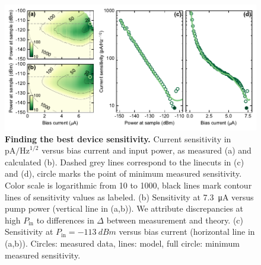 \begin{figure}
	\centering
	\includegraphics[width=\linewidth]{chapter-currentdetection/figures/Figure4}
	\caption{
		\textbf{Finding the best device sensitivity.}
		Current sensitivity in $\si{\pico\ampere\per\hertz\tothe{1/2}}$ versus bias current and input power, as measured (a) and calculated (b).
		Dashed grey lines correspond to the linecuts in (c) and (d), circle marks the point of minimum measured sensitivity.
		Color scale is logarithmic from 10 to 1000, black lines mark contour lines of sensitivity values as labeled.
		(b) Sensitivity at \SI{7.3}{\micro\ampere} versus pump power (vertical line in (a,b)).
		We attribute discrepancies at high $P_\text{in}$ to differences in $\Delta$ between measurement and theory.
		(c) Sensitivity at $P_\text{in}=\SI{-113}{dBm}$ versus bias current (horizontal line in (a,b)).
		Circles: measured data, lines: model, full circle: minimum measured sensitivity.
		\label{fig:figure4}
	}
\end{figure}


